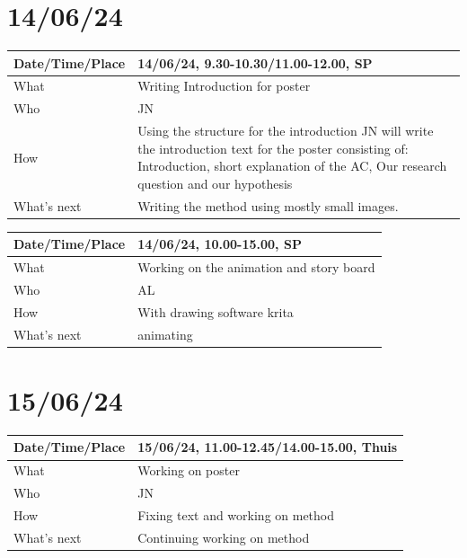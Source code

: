 \documentclass{article}
\begin{document}
\section{14/06/24}


\begin{table}[H]
\begin{tabular}{|p{1.5in}|p{4in}|}
\hline
Date/Time/Place & 14/06/24, 9.30-10.30/11.00-12.00, SP \\ \hline
What            & Writing Introduction for poster \\ \hline
Who             & JN \\ \hline
How             & Using the structure for the introduction JN will write the introduction text for the poster consisting of: Introduction, short explanation of the AC, Our research question and our hypothesis \\ \hline
What's next     & Writing the method using mostly small images. \\ \hline
\end{tabular}
\end{table}

\begin{table}[H]
\begin{tabular}{|p{1.5in}|p{4in}|}
\hline
Date/Time/Place & 14/06/24, 10.00-15.00, SP \\ \hline
What            &  Working on the animation and story board\\ \hline
Who             & AL \\ \hline
How             & With drawing software krita  \\ \hline
What's next     &  animating\\ \hline
\end{tabular}
\end{table}

\section{15/06/24}

\begin{table}[H]
\begin{tabular}{|p{1.5in}|p{4in}|}
\hline
Date/Time/Place & 15/06/24, 11.00-12.45/14.00-15.00, Thuis \\ \hline
What            & Working on poster \\ \hline
Who             & JN \\ \hline
How             & Fixing text and working on method \\ \hline
What's next     & Continuing working on method \\ \hline
\end{tabular}
\end{table}
\end{document}
